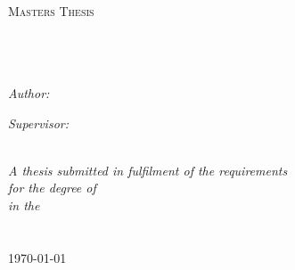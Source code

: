 \documentclass[11pt, oneside]{Thesis} %
\begin{document}
\begin{titlepage}
\begin{center}

\textsc{\LARGE \univname}\\[1.5cm] %
\textsc{\Large Masters Thesis}\\[0.5cm] %

\HRule \\[0.4cm] %
{\huge \bfseries \ttitle}\\[0.4cm] %
\HRule \\[1.5cm] %
 
\begin{minipage}{0.4\textwidth}
\begin{flushleft} \large
\emph{Author:}\\
{\authornames} %
\end{flushleft}
\end{minipage}
\begin{minipage}{0.4\textwidth}
\begin{flushright} \large
\emph{Supervisor:} \\
\supname %
\end{flushright}
\end{minipage}\\[3cm]
 
\large \textit{A thesis submitted in fulfilment of the requirements\\ for the degree of \degreename}\\[0.3cm] %
\textit{in the}\\[0.4cm]
\facname\\\deptname\\[2cm] %
 
{\large \today}\\[4cm] %
 
\vfill
\end{center}

\end{titlepage}

\end{document}
